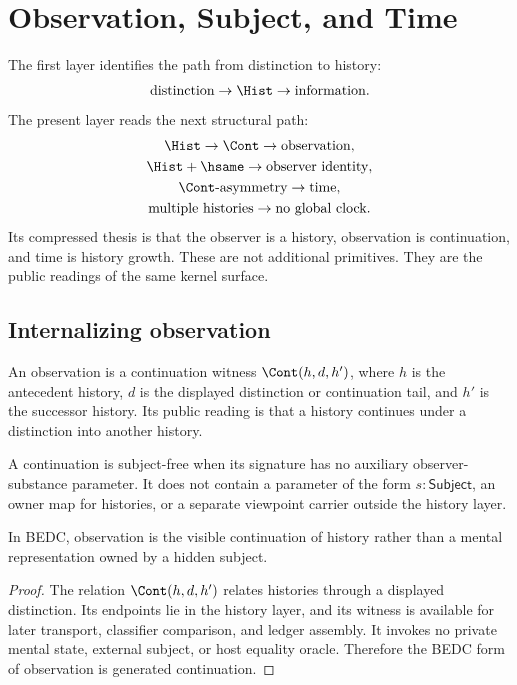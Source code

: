 \section{Observation, Subject, and Time}
\label{sec:visions-philosophy-observation-subject-time}

The first layer identifies the path from distinction to history:
$$
\begin{gathered}
\text{distinction} \to \Hist \to \text{information}.
\end{gathered}
$$
The present layer reads the next structural path:
$$
\begin{gathered}
\Hist \to \Cont \to \text{observation},\\
\Hist+\hsame \to \text{observer identity},\\
\Cont\text{-asymmetry} \to \text{time},\\
\text{multiple histories} \to \text{no global clock}.
\end{gathered}
$$
Its compressed thesis is that the observer is a history, observation is
continuation, and time is history growth. These are not additional
primitives. They are the public readings of the same kernel surface.

\subsection{Internalizing observation}
\label{subsec:philosophy-internalizing-observation}

\begin{definition}[Observation]
\label{def:philosophy-observation}
An observation is a continuation witness
\(\Cont(h,d,h')\), where \(h\) is the antecedent history, \(d\) is the
displayed distinction or continuation tail, and \(h'\) is the successor
history. Its public reading is that a history continues under a
distinction into another history.
\end{definition}

\begin{definition}
\label{def:philosophy-subject-free-observation}
A continuation is subject-free when its signature has no auxiliary
observer-substance parameter. It does not contain a parameter of the
form \(s:\mathsf{Subject}\), an owner map for histories, or a separate
viewpoint carrier outside the history layer.
\end{definition}

\begin{theorem}
\label{thm:philosophy-observation-is-continuation}
In BEDC, observation is the visible continuation of history rather than
a mental representation owned by a hidden subject.
\end{theorem}
\begin{proof}
The relation \(\Cont(h,d,h')\) relates histories through a displayed
distinction. Its endpoints lie in the history layer, and its witness is
available for later transport, classifier comparison, and ledger
assembly. It invokes no private mental state, external subject, or host
equality oracle. Therefore the BEDC form of observation is generated
continuation.
\end{proof}

